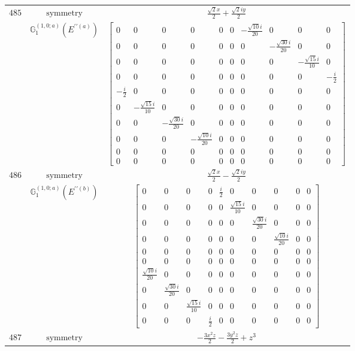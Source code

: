 \documentclass[fleqn,8pt,landscape]{jsarticle}
\begin{document}
\begin{longtable}{ccc}
$ 485 $ & $ \text{symmetry} $ & $ \frac{\sqrt{2} x}{2} + \frac{\sqrt{2} i y}{2} $ \\
$  $ & $ \mathbb{G}_{1}^{(1,0;a)}(E^{\prime\prime(a)}) $ & $ \begin{bmatrix} 0 & 0 & 0 & 0 & 0 & 0 & - \frac{\sqrt{10} i}{20} & 0 & 0 & 0 \\ 0 & 0 & 0 & 0 & 0 & 0 & 0 & - \frac{\sqrt{30} i}{20} & 0 & 0 \\ 0 & 0 & 0 & 0 & 0 & 0 & 0 & 0 & - \frac{\sqrt{15} i}{10} & 0 \\ 0 & 0 & 0 & 0 & 0 & 0 & 0 & 0 & 0 & - \frac{i}{2} \\ - \frac{i}{2} & 0 & 0 & 0 & 0 & 0 & 0 & 0 & 0 & 0 \\ 0 & - \frac{\sqrt{15} i}{10} & 0 & 0 & 0 & 0 & 0 & 0 & 0 & 0 \\ 0 & 0 & - \frac{\sqrt{30} i}{20} & 0 & 0 & 0 & 0 & 0 & 0 & 0 \\ 0 & 0 & 0 & - \frac{\sqrt{10} i}{20} & 0 & 0 & 0 & 0 & 0 & 0 \\ 0 & 0 & 0 & 0 & 0 & 0 & 0 & 0 & 0 & 0 \\ 0 & 0 & 0 & 0 & 0 & 0 & 0 & 0 & 0 & 0 \end{bmatrix} $ \\ \hline
$ 486 $ & $ \text{symmetry} $ & $ \frac{\sqrt{2} x}{2} - \frac{\sqrt{2} i y}{2} $ \\
$  $ & $ \mathbb{G}_{1}^{(1,0;a)}(E^{\prime\prime(b)}) $ & $ \begin{bmatrix} 0 & 0 & 0 & 0 & \frac{i}{2} & 0 & 0 & 0 & 0 & 0 \\ 0 & 0 & 0 & 0 & 0 & \frac{\sqrt{15} i}{10} & 0 & 0 & 0 & 0 \\ 0 & 0 & 0 & 0 & 0 & 0 & \frac{\sqrt{30} i}{20} & 0 & 0 & 0 \\ 0 & 0 & 0 & 0 & 0 & 0 & 0 & \frac{\sqrt{10} i}{20} & 0 & 0 \\ 0 & 0 & 0 & 0 & 0 & 0 & 0 & 0 & 0 & 0 \\ 0 & 0 & 0 & 0 & 0 & 0 & 0 & 0 & 0 & 0 \\ \frac{\sqrt{10} i}{20} & 0 & 0 & 0 & 0 & 0 & 0 & 0 & 0 & 0 \\ 0 & \frac{\sqrt{30} i}{20} & 0 & 0 & 0 & 0 & 0 & 0 & 0 & 0 \\ 0 & 0 & \frac{\sqrt{15} i}{10} & 0 & 0 & 0 & 0 & 0 & 0 & 0 \\ 0 & 0 & 0 & \frac{i}{2} & 0 & 0 & 0 & 0 & 0 & 0 \end{bmatrix} $ \\ \hline
$ 487 $ & $ \text{symmetry} $ & $ - \frac{3 x^{2} z}{2} - \frac{3 y^{2} z}{2} + z^{3} $ \\

\end{longtable}
\end{document}
